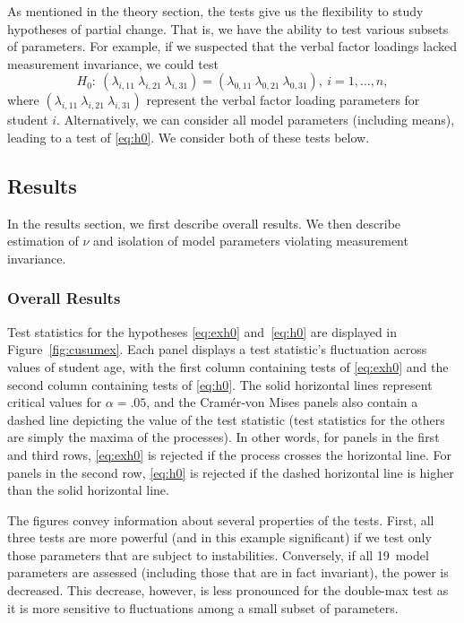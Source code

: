 \documentclass[man]{apa}
\begin{document}
As mentioned in the theory section, the 
tests give us the flexibility to study hypotheses of partial change.
That is, we have the ability to 
test various subsets of 
parameters.  For example, if we suspected that the verbal factor loadings
lacked measurement invariance, we could test
\begin{equation}
    \label{eq:exh0}
H_0:\ (\lambda_{i,11}\ \lambda_{i,21}\ \lambda_{i,31}) =
(\lambda_{0, 11}\ \lambda_{0, 21}\ \lambda_{0, 31}),\ i=1,\ldots,n,
\end{equation}
where $(\lambda_{i,11}\ \lambda_{i,21}\ \lambda_{i,31})$ represent the
verbal factor loading parameters for student $i$.  Alternatively, we
can consider all model parameters (including means), leading to a test
of \eqref{eq:h0}.  We consider both of these tests below.

\subsection{Results}
In the results section, we first describe overall results.  We then 
describe estimation of $\nu$ and 
isolation of model parameters violating
measurement invariance.

\subsubsection{Overall Results}
Test statistics for the hypotheses \eqref{eq:exh0} and~\eqref{eq:h0}
are displayed in  
Figure~\ref{fig:cusumex}.
Each panel displays a test 
statistic's fluctuation across values of student age, with the first
column containing tests of \eqref{eq:exh0} and the second column
containing tests of \eqref{eq:h0}.  The solid
horizontal 
lines represent critical values for $\alpha=.05$, and
the Cram\'{e}r-von Mises panels 
also contain a dashed line depicting the value of the test
statistic (test statistics for the others are simply 
the maxima of the processes).
In other words, for panels in the first and third rows, \eqref{eq:exh0} is
rejected if the process crosses the horizontal line.  For panels in
the second row, \eqref{eq:h0} is rejected if the dashed horizontal line is
higher than the solid horizontal line.

The figures convey information about several properties
of the tests. First, all three tests are more powerful (and in
this example significant) if we test only those parameters 
that are subject to instabilities. Conversely, if all 19~model
parameters are assessed (including those that are in fact invariant),
the power is decreased. This decrease, however, is less pronounced
for the double-max test as it is more 
sensitive to fluctuations among a small subset of parameters.
\end{document}
